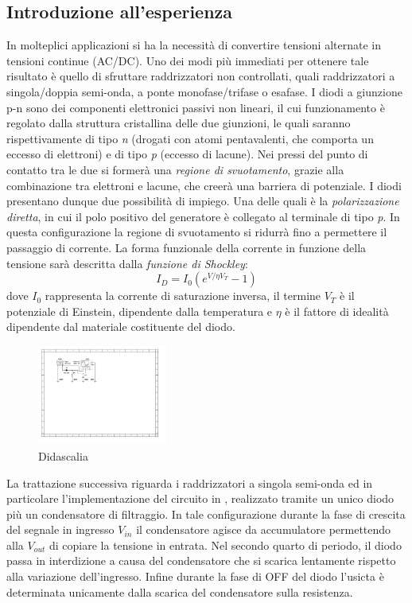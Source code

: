 \documentclass[journal]{IEEEtran}
\begin{document}
\subsection{\textbf{Introduzione all'esperienza}}
In molteplici applicazioni si ha la necessità di convertire tensioni alternate in tensioni continue (AC/DC). Uno dei modi più immediati per ottenere tale risultato è quello di sfruttare raddrizzatori non controllati, quali raddrizzatori a singola/doppia semi-onda, a ponte monofase/trifase o esafase.
I diodi a giunzione p-n sono dei componenti elettronici passivi non lineari, il cui funzionamento è regolato dalla struttura cristallina delle due giunzioni, le quali saranno rispettivamente di tipo \textit{n} (drogati con atomi pentavalenti, che comporta un eccesso di elettroni) e di tipo \textit{p} (eccesso di lacune). Nei pressi del punto di contatto tra le due si formerà una \textit{regione di svuotamento}, grazie alla combinazione tra elettroni e lacune, che creerà una barriera di potenziale. I diodi presentano dunque due possibilità di impiego. Una delle quali è la \textit{polarizzazione diretta}, in cui il polo positivo del generatore è collegato al terminale di
tipo \textit{p}. In questa configurazione la regione di svuotamento si ridurrà fino a permettere il passaggio di corrente. La forma funzionale della corrente in funzione della tensione sarà descritta dalla \textit{funzione di Shockley}: \[I_{D} = I_{0}(e^{V/\eta V_T}-1)\] dove $I_{0}$ rappresenta la corrente di saturazione inversa, il termine $V_{T}$ è il potenziale di Einstein, dipendente dalla temperatura e $\eta$ è il fattore di idealità dipendente dal materiale costituente del diodo.
\begin{figure}[H]%
\begin {center}
\includegraphics[width=0.38\textwidth]{sch-simulations/output/Diode-rectifier.pdf}
\caption{Didascalia}
\label{fig:oscilloscope}
\end {center}
\end{figure}
La trattazione successiva riguarda i raddrizzatori a singola semi-onda ed in particolare l'implementazione del circuito in , realizzato tramite un unico diodo più un condensatore di filtraggio. In tale configurazione durante la fase di crescita del segnale in ingresso $V_{in}$ il condensatore agisce da accumulatore permettendo alla $V_{out}$ di copiare la tensione in entrata. Nel secondo quarto di periodo, il diodo passa in interdizione a causa del condensatore che si scarica lentamente rispetto alla variazione dell'ingresso. Infine durante la fase di OFF del diodo l'usicta è determinata unicamente dalla scarica del condensatore sulla resistenza.
\end{document}
